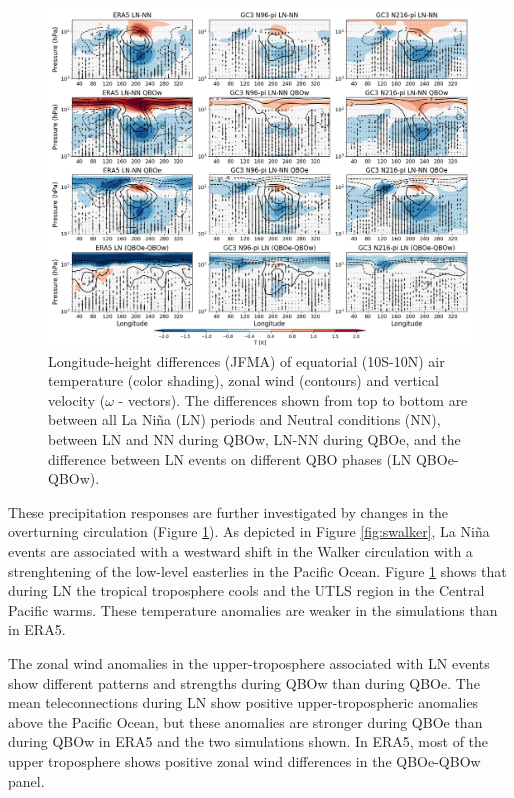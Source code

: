 \begin{figure}[t!]
\includegraphics[width=\linewidth]{figures/walker_wqbo_jfma}
\caption{Longitude-height differences (JFMA) of equatorial (10S-10N) air temperature (color shading), zonal wind (contours) and vertical velocity ($\omega$ - vectors). The differences shown from top to bottom are between all La Niña (LN) periods and Neutral conditions (NN), between LN and NN during QBOw, LN-NN during QBOe, and the difference between LN events on different QBO phases (LN QBOe-QBOw). 
}
\label{fig:qbowalker_pis}
\end{figure}

These precipitation responses are further investigated by changes in the overturning circulation (Figure \ref{fig:qbowalker_pis}). As depicted in Figure \ref{fig:swalker}, La Niña events are associated with a westward shift in the Walker circulation with a strenghtening of the low-level easterlies in the Pacific Ocean. 
Figure \ref{fig:qbowalker_pis} shows that during LN the tropical troposphere cools and the UTLS region in the Central Pacific warms. These temperature anomalies are weaker in the simulations than in ERA5. 

The zonal wind anomalies in the upper-troposphere associated with LN events show different patterns and strengths during QBOw than during QBOe. The mean teleconnections during LN show positive upper-tropospheric anomalies above the Pacific Ocean,  but these anomalies are stronger during QBOe than during QBOw in ERA5 and the two simulations shown. In ERA5, most of the upper troposphere shows positive zonal wind differences in the QBOe-QBOw panel. 


